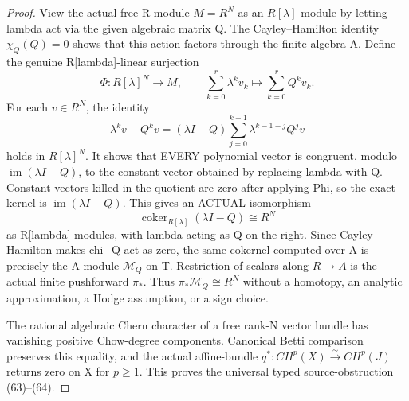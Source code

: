 \documentclass[11pt]{article}
\begin{document}
\begin{proof}
View the actual free R-module
$M=R^N$ as an $R[\lambda]$-module
by letting lambda act via the
given algebraic matrix Q.
The Cayley--Hamilton identity
$\chi_Q(Q)=0$ shows that this
action factors through the
finite algebra A.
Define the genuine R[lambda]-linear
surjection
\[
 \Phi:R[\lambda]^N\longrightarrow M,
 \qquad
 \sum_{k=0}^{r}\lambda^k v_k
                 \longmapsto
             \sum_{k=0}^{r}Q^k v_k.
\]
For each $v\in R^N$, the identity
\[
 \lambda^k v-Q^k v
   =(\lambda I-Q)
      \sum_{j=0}^{k-1}
         \lambda^{k-1-j}Q^j v
\]
holds in $R[\lambda]^N$.
It shows that EVERY polynomial
vector is congruent, modulo
$\operatorname{im}(\lambda I-Q)$,
to the constant vector obtained
by replacing lambda with Q.
Constant vectors killed in the
quotient are zero after applying
Phi, so the exact kernel is
$\operatorname{im}(\lambda I-Q)$.
This gives an ACTUAL isomorphism
\[
 \operatorname{coker}_{R[\lambda]}
       (\lambda I-Q)\cong R^N
\]
as R[lambda]-modules, with lambda
acting as Q on the right.
Since Cayley--Hamilton makes
chi_Q act as zero, the same
cokernel computed over A is
precisely the A-module
$\mathcal M_Q$ on T.
Restriction of scalars along
$R\to A$ is the actual finite
pushforward $\pi_*$.
Thus $\pi_*\mathcal M_Q
\cong R^N$ without a homotopy,
an analytic approximation, a
Hodge assumption, or a sign choice.

The rational algebraic Chern character
of a free rank-N vector bundle has
vanishing positive Chow-degree
components. Canonical Betti
comparison preserves this equality,
and the actual affine-bundle
$q^*:CH^p(X)\overset\sim\to CH^p(J)$
returns zero on X for $p\ge1$.
This proves the universal typed
source-obstruction (63)--(64).
\end{proof}
\end{document}

